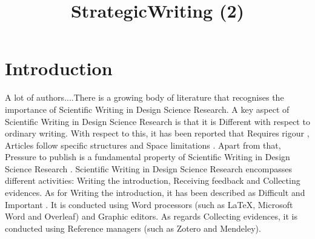 \documentclass{article}
\title{StrategicWriting (2)}
\author{}
\begin{document}
\maketitle
      

\section{Introduction}



A lot of authors....There is a growing body of literature that recognises the importance of Scientific Writing in Design Science Research. A key aspect of Scientific Writing in Design Science Research is that it is Different with respect to ordinary writing. With respect to this, it has been reported that Requires rigour \cite{JohannessonAnIntroduction}, Articles follow specific structures \cite{Turbek2016} \cite{JohannessonAnIntroduction} \cite{psychologicalscience.org} \cite{Kanoksilapatham2012} and Space limitations \cite{Gregor2013} \cite{Hsu2004}. Apart from that, Pressure to publish is a fundamental property of Scientific Writing in Design Science Research \cite{CoylarBecomingwriters} \cite{Turbek2016} \cite{Sorensen1994} \cite{Kanoksilapatham2012} \cite{Mizumoto2017} \cite{Cotterall2011}. Scientific Writing in Design Science Research encompasses different activities: Writing the introduction, Receiving feedback and Collecting evidences. As for Writing the introduction, it has been described as Difficult \cite{Hsu2004} \cite{Hsu2004} \cite{Hsu2004} \cite{PeatScientificWriting.} \cite{Cotterall2011} and Important \cite{Gregor2013} \cite{Turbek2016} \cite{Turbek2016} \cite{SwalesTheWriting} \cite{Khaw2017} \cite{Kanoksilapatham2012}. It is conducted using Word processors (such as LaTeX, Microsoft Word and Overleaf) and Graphic editors. As regards Collecting evidences, it is conducted using Reference managers (such as Zotero and Mendeley). 
    
\end{document}
